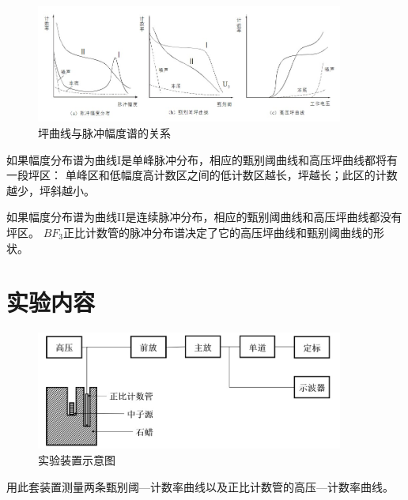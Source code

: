 \documentclass[a4paper,UTF8]{ctexart}
\begin{document}
\begin{figure}[H]
    \centering
    \begin{minipage}[b]{1\textwidth}
        \centering
        \includegraphics[width=0.9\textwidth]{./fig2.jpg}
        \caption{坪曲线与脉冲幅度谱的关系}
    \end{minipage}
\end{figure}

如果幅度分布谱为曲线I是单峰脉冲分布，相应的甄别阈曲线和高压坪曲线都将有一段坪区：
单峰区和低幅度高计数区之间的低计数区越长，坪越长；此区的计数越少，坪斜越小。

如果幅度分布谱为曲线II是连续脉冲分布，相应的甄别阈曲线和高压坪曲线都没有坪区。
$BF_3$正比计数管的脉冲分布谱决定了它的高压坪曲线和甄别阈曲线的形状。

\section{实验内容}

\begin{figure}[H]
    \centering
    \begin{minipage}[b]{0.9\textwidth}
        \centering
        \includegraphics[width=0.9\textwidth]{./fig3.jpg}
        \caption{实验装置示意图}
    \end{minipage}
\end{figure}

用此套装置测量两条甄别阈—计数率曲线以及正比计数管的高压—计数率曲线。
\end{document}
